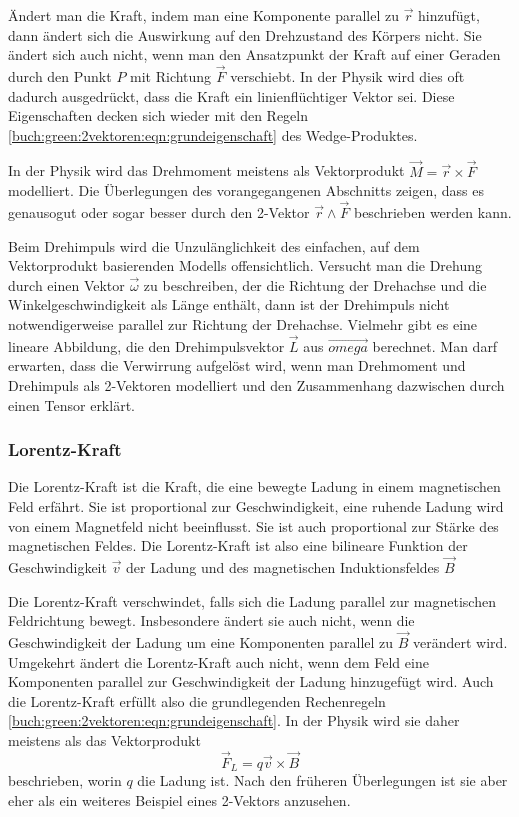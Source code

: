 Ändert man die Kraft, indem man eine Komponente parallel zu $\vec{r}$
hinzufügt, dann ändert sich die Auswirkung auf den Drehzustand des
Körpers nicht.
Sie ändert sich auch nicht, wenn man den Ansatzpunkt der Kraft
auf einer Geraden durch den Punkt $P$ mit Richtung $\vec{F}$
verschiebt.
In der Physik wird dies oft dadurch ausgedrückt, dass die Kraft
ein linienflüchtiger Vektor sei.
Diese Eigenschaften decken sich wieder mit den Regeln
\eqref{buch:green:2vektoren:eqn:grundeigenschaft}
des Wedge-Produktes.

In der Physik wird das Drehmoment meistens als Vektorprodukt
$\vec{M}=\vec{r}\times\vec{F}$ modelliert.
Die Überlegungen des vorangegangenen Abschnitts zeigen, dass
es genausogut oder sogar besser durch den 2-Vektor
$\vec{r}\wedge\vec{F}$ beschrieben werden kann.

Beim Drehimpuls wird die Unzulänglichkeit des einfachen, auf
dem Vektorprodukt basierenden Modells offensichtlich.
Versucht man die Drehung durch einen Vektor $\vec{\omega}$ zu
beschreiben, der die Richtung der Drehachse und die Winkelgeschwindigkeit
als Länge enthält, dann ist der Drehimpuls nicht notwendigerweise
parallel zur Richtung der Drehachse.
Vielmehr gibt es eine lineare Abbildung, die den Drehimpulsvektor
$\vec{L}$ aus $\vec{omega}$ berechnet.
Man darf erwarten, dass die Verwirrung aufgelöst wird, wenn man
Drehmoment und Drehimpuls als 2-Vektoren modelliert und den Zusammenhang
dazwischen durch einen Tensor erklärt.

%
%
\subsubsection{Lorentz-Kraft}

Die Lorentz-Kraft ist die Kraft, die eine bewegte Ladung in einem
magnetischen Feld erfährt.
Sie ist proportional zur Geschwindigkeit, eine ruhende Ladung
wird von einem Magnetfeld nicht beeinflusst.
Sie ist auch proportional zur Stärke des magnetischen Feldes.
Die Lorentz-Kraft ist also eine bilineare Funktion der
Geschwindigkeit $\vec{v}$ der Ladung und des magnetischen
Induktionsfeldes $\vec{B}$

Die Lorentz-Kraft verschwindet, falls sich die Ladung parallel zur
magnetischen Feldrichtung bewegt.
Insbesondere ändert sie auch nicht, wenn die Geschwindigkeit der
Ladung um eine Komponenten parallel zu $\vec{B}$ verändert wird.
Umgekehrt ändert die Lorentz-Kraft auch nicht, wenn dem Feld
eine Komponenten parallel zur Geschwindigkeit der Ladung hinzugefügt
wird.
Auch die Lorentz-Kraft erfüllt also die grundlegenden
Rechenregeln \eqref{buch:green:2vektoren:eqn:grundeigenschaft}.
In der Physik wird sie daher meistens als das Vektorprodukt
\[
\vec{F}_L
=
q\vec{v}\times \vec{B}
\]
beschrieben, worin $q$ die Ladung ist.
Nach den früheren Überlegungen ist sie aber eher als ein weiteres
Beispiel eines 2-Vektors anzusehen.

